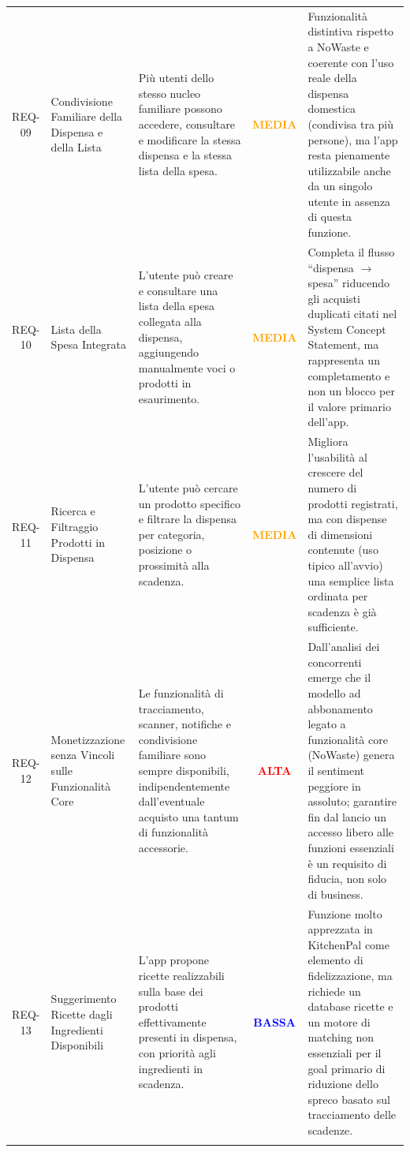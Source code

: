 \documentclass[11pt,a4paper]{article}
\begin{document}
{\begin{longtable}{
  c 
  >{\raggedright\arraybackslash}p{} 
  >{\raggedright\arraybackslash}p{} 
  c 
  >{\raggedright\arraybackslash}p{}
}
REQ-09 & Condivisione Familiare della Dispensa e della Lista & Più utenti dello stesso nucleo familiare possono accedere, consultare e modificare la stessa dispensa e la stessa lista della spesa. & \textcolor{orange}{\textbf{MEDIA}} & Funzionalità distintiva rispetto a NoWaste e coerente con l'uso reale della dispensa domestica (condivisa tra più persone), ma l'app resta pienamente utilizzabile anche da un singolo utente in assenza di questa funzione. \\ \addlinespace[0.6em]

REQ-10 & Lista della Spesa Integrata & L'utente può creare e consultare una lista della spesa collegata alla dispensa, aggiungendo manualmente voci o prodotti in esaurimento. & \textcolor{orange}{\textbf{MEDIA}} & Completa il flusso ``dispensa $\rightarrow$ spesa'' riducendo gli acquisti duplicati citati nel System Concept Statement, ma rappresenta un completamento e non un blocco per il valore primario dell'app. \\ \addlinespace[0.6em]

REQ-11 & Ricerca e Filtraggio Prodotti in Dispensa & L'utente può cercare un prodotto specifico e filtrare la dispensa per categoria, posizione o prossimità alla scadenza. & \textcolor{orange}{\textbf{MEDIA}} & Migliora l'usabilità al crescere del numero di prodotti registrati, ma con dispense di dimensioni contenute (uso tipico all'avvio) una semplice lista ordinata per scadenza è già sufficiente. \\ \addlinespace[0.6em]

REQ-12 & Monetizzazione senza Vincoli sulle Funzionalità Core & Le funzionalità di tracciamento, scanner, notifiche e condivisione familiare sono sempre disponibili, indipendentemente dall'eventuale acquisto una tantum di funzionalità accessorie. & \textcolor{red}{\textbf{ALTA}} & Dall'analisi dei concorrenti emerge che il modello ad abbonamento legato a funzionalità core (NoWaste) genera il sentiment peggiore in assoluto; garantire fin dal lancio un accesso libero alle funzioni essenziali è un requisito di fiducia, non solo di business. \\ \addlinespace[0.6em]

REQ-13 & Suggerimento Ricette dagli Ingredienti Disponibili & L'app propone ricette realizzabili sulla base dei prodotti effettivamente presenti in dispensa, con priorità agli ingredienti in scadenza. & \textcolor{blue}{\textbf{BASSA}} & Funzione molto apprezzata in KitchenPal come elemento di fidelizzazione, ma richiede un database ricette e un motore di matching non essenziali per il goal primario di riduzione dello spreco basato sul tracciamento delle scadenze. \\ \addlinespace[0.6em]


\end{longtable}}
\end{document}
